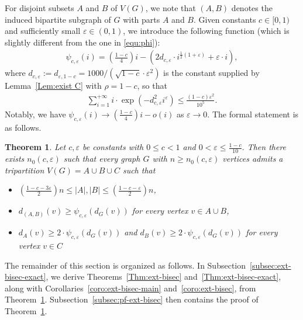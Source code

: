 \documentclass{aic}
\newtheorem{theorem}[dfn]{Theorem}
\begin{document}
	
	
	
	For disjoint subsets $A$ and $B$ of $V(G)$, we note that $(A,B)$ denotes the induced bipartite subgraph of $G$ with parts $A$ and $B$.
	Given constants $c\in [0,1)$ and sufficiently small $\varepsilon\in (0,1)$,
	we introduce the following function (which is slightly different from the one in \eqref{equ:phi}):
	\begin{align}\label{equ:psi}
		\psi_{c,\varepsilon}(i)=\left(\frac{1-c}{4}\right)i-\left(2d_{c,\varepsilon}\cdot i^{\frac{1}{2}(1+\varepsilon)}+\varepsilon\cdot i\right),
	\end{align}
	where $d_{c,\varepsilon}:=d_{\varepsilon,1-c}=1000/(\sqrt{1-c}\cdot \varepsilon^2)$ is the constant supplied by Lemma~\ref{Lem:exist C} with $\rho=1-c$, so that
	\begin{align}\label{equ:sum-i-ext}
		\sum_{i=1}^{+\infty} i\cdot \exp(-d_{c,\varepsilon}^2i^{\varepsilon})\leq \frac{(1-c)\varepsilon^2}{10^5}.
	\end{align}
	Notably, we have $\psi_{c, \varepsilon}(i) \to \left(\frac{1-c}{4}\right)i - o(i)$ as $\varepsilon\to 0$.
	The formal statement is as follows.
	
	
	
	\begin{theorem}\label{Thm:min-outdegree}
		Let $c, \varepsilon$ be constants with $0\leq c<1$ and $0<\varepsilon\leq \frac{1-c}{10}.$
		Then there exists $n_0(c,\varepsilon)$ such that every graph $G$ with $n\geq n_0(c,\varepsilon)$ vertices admits a tripartition $V(G)=A\cup B\cup C$ such that
		\begin{itemize}
			\item[(a).] $\left(\frac{1-c-3\varepsilon}{2}\right)n\leq |A|,|B|\leq \left(\frac{1-c-\varepsilon}{2}\right)n$,
			\item[(b).] $d_{(A,B)}(v)\geq \psi_{c,\varepsilon}(d_G(v))$ for every vertex $v\in A\cup B$,
			\item[(c).] $d_{A}(v)\geq 2\cdot \psi_{c,\varepsilon}(d_G(v))$ and $d_B(v)\geq 2\cdot \psi_{c,\varepsilon}(d_G(v))$ for every vertex $v\in C$
		\end{itemize}
	\end{theorem}
	
	The remainder of this section is organized as follows.
	In Subsection~\ref{subsec:ext-bisec-exact}, we derive Theorems~\ref{Thm:ext-bisec} and~\ref{Thm:ext-bisec-exact}, along with Corollaries~\ref{coro:ext-bisec-main} and~\ref{coro:ext-bisec}, from Theorem~\ref{Thm:min-outdegree}.
	Subsection~\ref{subsec:pf-ext-bisec} then contains the proof of Theorem~\ref{Thm:min-outdegree}.
	
\end{document}
